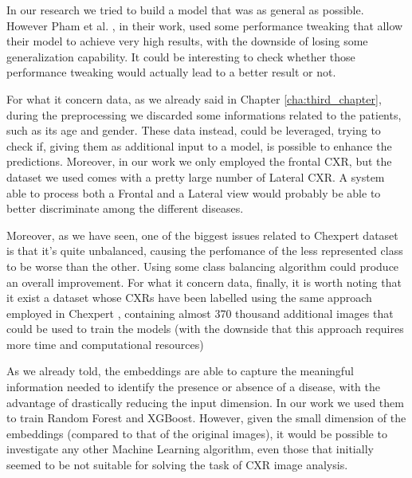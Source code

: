 \vspace{5mm}

In our research we tried to build a model that was as general as possible. However Pham et al. \cite{pham2019interpreting}, in their work, used some performance tweaking that allow their model to achieve very high results, with the downside of losing some generalization capability. It could be interesting to check whether those performance tweaking would actually lead to a better result or not.

\vspace{5mm}
For what it concern data, as we already said in Chapter \ref{cha:third_chapter}, during the preprocessing we discarded some informations related to the patients, such as its age and gender. These data instead, could be leveraged, trying to check if, giving them as additional input to a model, is possible to enhance the predictions. 
Moreover, in our work we only employed the frontal CXR, but the dataset we used comes with a pretty large number of Lateral CXR. A system able to process both a Frontal and a Lateral view would probably be able to better discriminate among the different diseases. 

\vspace{5mm}

Moreover, as we have seen, one of the biggest issues related to Chexpert dataset is that it's quite unbalanced, causing the perfomance of the less represented class to be worse than the other. Using some class balancing algorithm could produce an overall improvement.
For what it concern data, finally, it is worth noting that it exist a dataset whose \acp{CXR} have been labelled using the same approach employed in Chexpert \cite{johnson2019mimiccxrjpg}, containing almost 370 thousand additional images that could be used to train the models (with the downside that this approach requires more time and computational resources)

\vspace{5mm}

As we already told, the embeddings are able to capture the meaningful information needed to identify the presence or absence of a disease, with the advantage of drastically reducing the input dimension. In our work we used them to train Random Forest and XGBoost. However, given the small dimension of the embeddings (compared to that of the original images), it would be possible to investigate any other Machine Learning algorithm, even those that initially seemed to be not suitable for solving the task of CXR image analysis.

